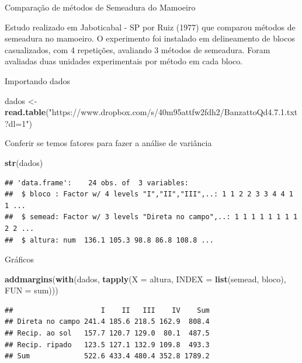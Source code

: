 \documentclass[
]{book}
\newenvironment{Shaded}{\begin{snugshade}}{\end{snugshade}}
\newcommand{\DataTypeTok}[1]{\textcolor[rgb]{0.13,0.29,0.53}{#1}}
\newcommand{\KeywordTok}[1]{\textcolor[rgb]{0.13,0.29,0.53}{\textbf{#1}}}
\newcommand{\NormalTok}[1]{#1}
\newcommand{\StringTok}[1]{\textcolor[rgb]{0.31,0.60,0.02}{#1}}
\begin{document}
Comparação de métodos de Semeadura do Mamoeiro

Estudo realizado em Jaboticabal - SP por Ruiz (1977) que comparou métodos de semeadura no mamoeiro. O experimento foi instalado em delineamento de blocos casualizados, com 4 repetições, avaliando 3 métodos de semeadura. Foram avaliadas duas unidades experimentais por método em cada bloco.

Importando dados

\begin{Shaded}
\begin{Highlighting}[]
\NormalTok{dados <-}\StringTok{ }\KeywordTok{read.table}\NormalTok{(}\StringTok{"https://www.dropbox.com/s/40m95attfw2fdh2/BanzattoQd4.7.1.txt?dl=1"}\NormalTok{) }
\end{Highlighting}
\end{Shaded}

Conferir se temos fatores para fazer a análise de variância

\begin{Shaded}
\begin{Highlighting}[]
\KeywordTok{str}\NormalTok{(dados)}
\end{Highlighting}
\end{Shaded}

\begin{verbatim}
## 'data.frame':    24 obs. of  3 variables:
##  $ bloco : Factor w/ 4 levels "I","II","III",..: 1 1 2 2 3 3 4 4 1 1 ...
##  $ semead: Factor w/ 3 levels "Direta no campo",..: 1 1 1 1 1 1 1 1 2 2 ...
##  $ altura: num  136.1 105.3 98.8 86.8 108.8 ...
\end{verbatim}

Gráficos

\begin{Shaded}
\begin{Highlighting}[]
\KeywordTok{addmargins}\NormalTok{(}\KeywordTok{with}\NormalTok{(dados,}
  \KeywordTok{tapply}\NormalTok{(}\DataTypeTok{X =}\NormalTok{ altura,}
    \DataTypeTok{INDEX =} \KeywordTok{list}\NormalTok{(semead, bloco),}
    \DataTypeTok{FUN =}\NormalTok{ sum)))}
\end{Highlighting}
\end{Shaded}

\begin{verbatim}
##                     I    II   III    IV    Sum
## Direta no campo 241.4 185.6 218.5 162.9  808.4
## Recip. ao sol   157.7 120.7 129.0  80.1  487.5
## Recip. ripado   123.5 127.1 132.9 109.8  493.3
## Sum             522.6 433.4 480.4 352.8 1789.2
\end{verbatim}
\end{document}
